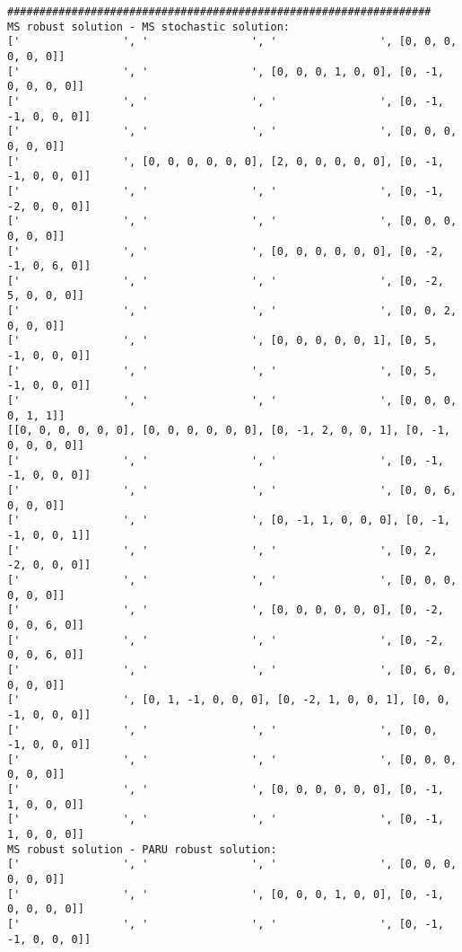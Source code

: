 \documentclass[10pt]{article}
\theoremstyle{plain}
\theoremstyle{definition}
\theoremstyle{remark}
\begin{document}
\begin{minipage}[t]{9cm}
\begin{verbatim}
##################################################################
MS robust solution - MS stochastic solution:
['                ', '                ', '                ', [0, 0, 0, 0, 0, 0]]
['                ', '                ', [0, 0, 0, 1, 0, 0], [0, -1, 0, 0, 0, 0]]
['                ', '                ', '                ', [0, -1, -1, 0, 0, 0]]
['                ', '                ', '                ', [0, 0, 0, 0, 0, 0]]
['                ', [0, 0, 0, 0, 0, 0], [2, 0, 0, 0, 0, 0], [0, -1, -1, 0, 0, 0]]
['                ', '                ', '                ', [0, -1, -2, 0, 0, 0]]
['                ', '                ', '                ', [0, 0, 0, 0, 0, 0]]
['                ', '                ', [0, 0, 0, 0, 0, 0], [0, -2, -1, 0, 6, 0]]
['                ', '                ', '                ', [0, -2, 5, 0, 0, 0]]
['                ', '                ', '                ', [0, 0, 2, 0, 0, 0]]
['                ', '                ', [0, 0, 0, 0, 0, 1], [0, 5, -1, 0, 0, 0]]
['                ', '                ', '                ', [0, 5, -1, 0, 0, 0]]
['                ', '                ', '                ', [0, 0, 0, 0, 1, 1]]
[[0, 0, 0, 0, 0, 0], [0, 0, 0, 0, 0, 0], [0, -1, 2, 0, 0, 1], [0, -1, 0, 0, 0, 0]]
['                ', '                ', '                ', [0, -1, -1, 0, 0, 0]]
['                ', '                ', '                ', [0, 0, 6, 0, 0, 0]]
['                ', '                ', [0, -1, 1, 0, 0, 0], [0, -1, -1, 0, 0, 1]]
['                ', '                ', '                ', [0, 2, -2, 0, 0, 0]]
['                ', '                ', '                ', [0, 0, 0, 0, 0, 0]]
['                ', '                ', [0, 0, 0, 0, 0, 0], [0, -2, 0, 0, 6, 0]]
['                ', '                ', '                ', [0, -2, 0, 0, 6, 0]]
['                ', '                ', '                ', [0, 6, 0, 0, 0, 0]]
['                ', [0, 1, -1, 0, 0, 0], [0, -2, 1, 0, 0, 1], [0, 0, -1, 0, 0, 0]]
['                ', '                ', '                ', [0, 0, -1, 0, 0, 0]]
['                ', '                ', '                ', [0, 0, 0, 0, 0, 0]]
['                ', '                ', [0, 0, 0, 0, 0, 0], [0, -1, 1, 0, 0, 0]]
['                ', '                ', '                ', [0, -1, 1, 0, 0, 0]]
MS robust solution - PARU robust solution:
['                ', '                ', '                ', [0, 0, 0, 0, 0, 0]]
['                ', '                ', [0, 0, 0, 1, 0, 0], [0, -1, 0, 0, 0, 0]]
['                ', '                ', '                ', [0, -1, -1, 0, 0, 0]]

\end{verbatim}
\end{minipage}
\end{document}
